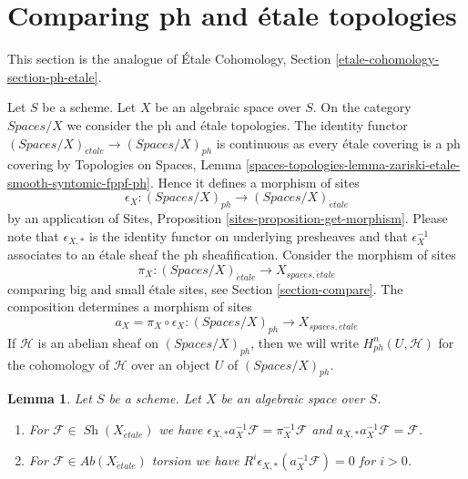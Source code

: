 \documentclass{stacks-project}
\theoremstyle{plain}
\newtheorem{lemma}[subsection]{Lemma}
\theoremstyle{definition}
\theoremstyle{remark}
\numberwithin{equation}{subsection}
\def\Sh{\mathop{\mathit{Sh}}\nolimits}
\def\etale{{\acute{e}tale}}
\begin{document}
\section{Comparing ph and \'etale topologies}
\label{section-ph-etale}

\noindent
This section is the analogue of
\'Etale Cohomology, Section \ref{etale-cohomology-section-ph-etale}.

\medskip\noindent
Let $S$ be a scheme. Let $X$ be an algebraic space over $S$.
On the category $\textit{Spaces}/X$ we consider the ph
and \'etale topologies. The identity functor
$(\textit{Spaces}/X)_\etale \to (\textit{Spaces}/X)_{ph}$
is continuous as every \'etale covering is a ph covering by
Topologies on Spaces, Lemma
\ref{spaces-topologies-lemma-zariski-etale-smooth-syntomic-fppf-ph}.
Hence it defines a morphism of sites
$$
\epsilon_X :
(\textit{Spaces}/X)_{ph} \longrightarrow (\textit{Spaces}/X)_\etale
$$
by an application of Sites, Proposition \ref{sites-proposition-get-morphism}.
Please note that $\epsilon_{X, *}$ is the identity functor on underlying
presheaves and that $\epsilon_X^{-1}$ associates to an \'etale sheaf the
ph sheafification.
Consider the morphism of sites
$$
\pi_X : (\textit{Spaces}/X)_\etale \longrightarrow X_{spaces, \etale}
$$
comparing big and small \'etale sites, see Section \ref{section-compare}.
The composition determines a morphism of sites
$$
a_X = \pi_X \circ \epsilon_X :
(\textit{Spaces}/X)_{ph}
\longrightarrow
X_{spaces, \etale}
$$
If $\mathcal{H}$ is an abelian sheaf on $(\textit{Spaces}/X)_{ph}$,
then we will write $H^n_{ph}(U, \mathcal{H})$ for the cohomology
of $\mathcal{H}$ over an object $U$ of $(\textit{Spaces}/X)_{ph}$.

\begin{lemma}
\label{lemma-comparison-ph-etale}
Let $S$ be a scheme. Let $X$ be an algebraic space over $S$.
\begin{enumerate}
\item For $\mathcal{F} \in \Sh(X_\etale)$ we have
$\epsilon_{X, *}a_X^{-1}\mathcal{F} = \pi_X^{-1}\mathcal{F}$
and $a_{X, *}a_X^{-1}\mathcal{F} = \mathcal{F}$.
\item For $\mathcal{F} \in \textit{Ab}(X_\etale)$ torsion we have
$R^i\epsilon_{X, *}(a_X^{-1}\mathcal{F}) = 0$ for $i > 0$.
\end{enumerate}
\end{lemma}
\end{document}
